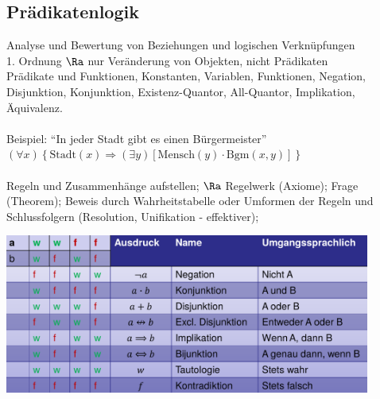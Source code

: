 \documentclass[german,color,6pt]{latex4ei/latex4ei_sheet}
\begin{document}
\begin{sectionbox}
\subsection{Prädikatenlogik}
Analyse und Bewertung von Beziehungen und logischen Verknüpfungen\\
1. Ordnung $\Ra$ nur Veränderung von Objekten, nicht Prädikaten\\
Prädikate und Funktionen, Konstanten, Variablen, Funktionen, Negation, Disjunktion, Konjunktion, Existenz-Quantor, All-Quantor, Implikation, Äquivalenz.\\\\
Beispiel: "`In jeder Stadt gibt es einen Bürgermeister"' \\
$(\forall x) \left\{ \text{Stadt}(x)  \Rightarrow (\exists y) \left[ \text{Mensch}(y) \cdot \text{Bgm}(x,y) \right] \right\}$\\\\
Regeln und Zusammenhänge aufstellen; $\Ra$ Regelwerk (Axiome); Frage (Theorem); Beweis durch Wahrheitstabelle oder Umformen der Regeln und Schlussfolgern (Resolution, Unifikation - effektiver);
	\begin{center}
		\includegraphics[width=0.9\textwidth]{truth_table}
	\end{center}


\end{sectionbox}
\end{document}
